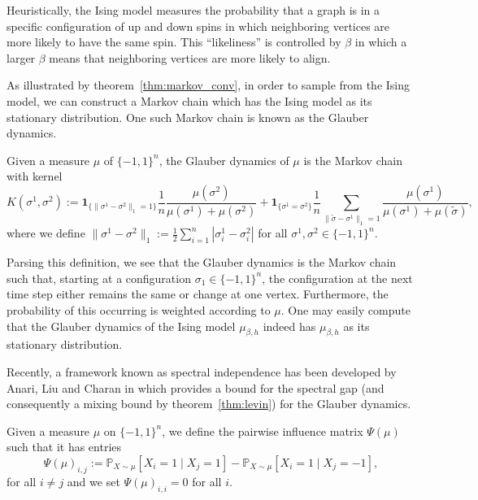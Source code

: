 Heuristically, the Ising model measures the probability that a graph is in a specific configuration of 
up and down spins in which neighboring vertices are more likely to have the same spin. This ``likeliness'' 
is controlled by \(\beta\) in which a larger \(\beta\) means that neighboring vertices are more likely to
align. 

As illustrated by theorem~\ref{thm:markov_conv}, in order to sample from the Ising model, we can 
construct a Markov chain which has the Ising model as its stationary distribution. One such Markov chain 
is known as the Glauber dynamics.

\begin{definition}
  Given a measure \(\mu\) of \(\{-1, 1\}^n\), the Glauber dynamics of \(\mu\) is the Markov chain 
  with kernel 
  \begin{equation}\label{eq:glauber_ker}
    K(\sigma^1, \sigma^2) := 
      \mathbf{1}_{\{\|\sigma^1 - \sigma^2\|_1 = 1\}}\frac{1}{n}\frac{\mu(\sigma^2)}{\mu(\sigma^1) + \mu(\sigma^2)}
    + \mathbf{1}_{\{\sigma^1 = \sigma^2\}} \frac{1}{n}\sum_{\|\tilde \sigma - \sigma^1\|_1 = 1}
    \frac{\mu(\sigma^1)}{\mu(\sigma^1) + \mu(\tilde \sigma)},
  \end{equation}
  where we define \(\|\sigma^1 - \sigma^2\|_1 := \frac{1}{2}\sum_{i = 1}^n |\sigma_i^1 - \sigma_i^2|\) 
  for all \(\sigma^1, \sigma^2 \in \{-1, 1\}^n\).
\end{definition}

Parsing this definition, we see that the Glauber dynamics is the Markov chain such that, starting at a 
configuration \(\sigma_1 \in \{-1, 1\}^n\), the configuration at the next time step either remains the 
same or change at one vertex. Furthermore, the probability of this occurring is weighted according to 
\(\mu\). One may easily compute that the Glauber dynamics of the Ising model \(\mu_{\beta, h}\) indeed 
has \(\mu_{\beta, h}\) as its stationary distribution.

Recently, a framework known as spectral independence has been developed by Anari, Liu and Charan in 
\cite{Anari_2020} which provides a bound for the spectral gap (and consequently a mixing bound by 
theorem~\ref{thm:levin}) for the Glauber dynamics. 

\begin{definition}
  Given a measure \(\mu\) on \(\{-1, 1\}^n\), we define the pairwise influence matrix \(\Psi(\mu)\) 
  such that it has entries 
  \[\Psi(\mu)_{i, j} := \mathbb{P}_{X \sim \mu}[X_i = 1 \mid X_j = 1] - \mathbb{P}_{X \sim \mu}[X_i = 1 \mid X_j = -1],\]
  for all \(i \neq j\) and we set \(\Psi(\mu)_{i, i} = 0\) for all \(i\).
\end{definition}

